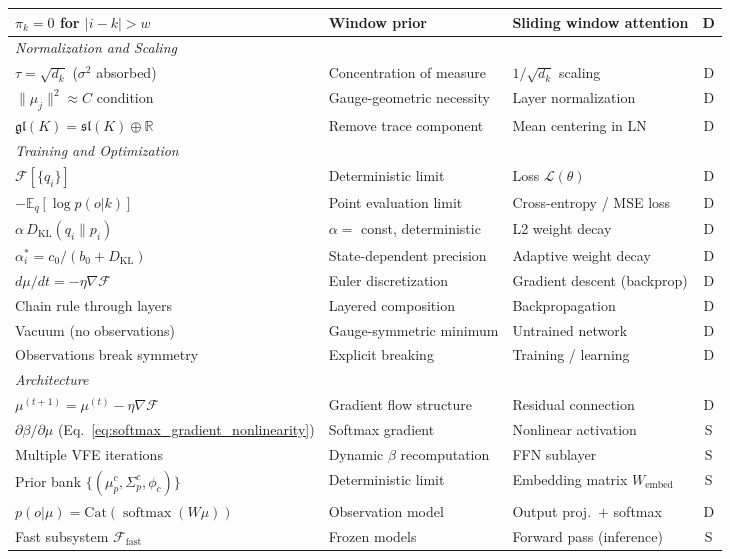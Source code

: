 \documentclass[twoside,11pt]{article}
\newcommand{\softmax}{\operatorname{softmax}}
\newcommand{\KL}{\operatorname{KL}}
\begin{document}
\begin{table}[p]
\begin{tabular}{|l|l|l|c|}
$\pi_k = 0$ for $|i\!-\!k|>w$ & Window prior & Sliding window attention & D \\
\hline
\multicolumn{4}{|l|}{\textit{Normalization and Scaling}} \\
\hline
$\tau = \sqrt{d_k}$ ($\sigma^2$ absorbed) & Concentration of measure & $1/\sqrt{d_k}$ scaling & D \\
$\|\mu_j\|^2 \approx C$ condition & Gauge-geometric necessity & Layer normalization & D \\
$\mathfrak{gl}(K) \!=\! \mathfrak{sl}(K) \oplus \mathbb{R}$ & Remove trace component & Mean centering in LN & D \\
\hline
\multicolumn{4}{|l|}{\textit{Training and Optimization}} \\
\hline
$\mathcal{F}[\{q_i\}]$ & Deterministic limit & Loss $\mathcal{L}(\theta)$ & D \\
$-\mathbb{E}_q[\log p(o|k)]$ & Point evaluation limit & Cross-entropy / MSE loss & D \\
$\alpha\, D_{\KL}(q_i \| p_i)$ & $\alpha = $ const, deterministic & L2 weight decay & D \\
$\alpha_i^* \!=\! c_0/(b_0 + D_{\KL})$ & State-dependent precision & Adaptive weight decay & D \\
$d\mu/dt = -\eta\nabla\mathcal{F}$ & Euler discretization & Gradient descent (backprop) & D \\
Chain rule through layers & Layered composition & Backpropagation & D \\
Vacuum (no observations) & Gauge-symmetric minimum & Untrained network & D \\
Observations break symmetry & Explicit breaking & Training / learning & D \\
\hline
\multicolumn{4}{|l|}{\textit{Architecture}} \\
\hline
$\mu^{(t+1)} \!=\! \mu^{(t)} - \eta\nabla\mathcal{F}$ & Gradient flow structure & Residual connection & D \\
$\partial\beta/\partial\mu$ (Eq.~\ref{eq:softmax_gradient_nonlinearity}) & Softmax gradient & Nonlinear activation & S \\
Multiple VFE iterations & Dynamic $\beta$ recomputation & FFN sublayer & S \\
Prior bank $\{(\mu_p^c, \Sigma_p^c, \phi_c)\}$ & Deterministic limit & Embedding matrix $W_{\text{embed}}$ & S \\
$p(o|\mu) = \mathrm{Cat}(\softmax(W\mu))$ & Observation model & Output proj.\ $+$ softmax & D \\
Fast subsystem $\mathcal{F}_{\text{fast}}$ & Frozen models & Forward pass (inference) & S \\

\end{tabular}
\end{table}
\end{document}
